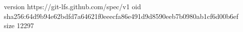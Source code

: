 version https://git-lfs.github.com/spec/v1
oid sha256:64d9b94e62bdfd7a64621f0eeecfa86e491d9d8590eeb7b0980ab1cf6d00b6ef
size 12297
